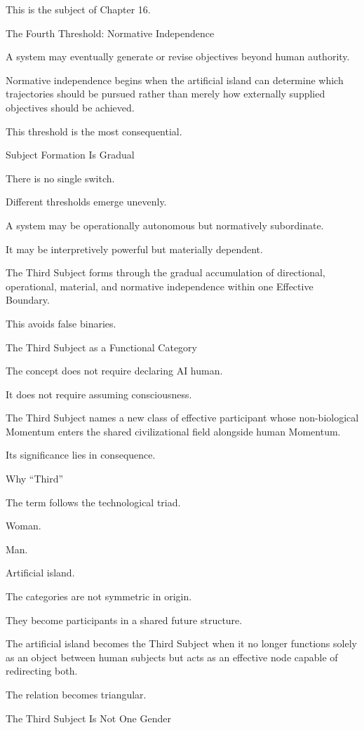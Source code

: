 This is the subject of Chapter 16.

The Fourth Threshold: Normative Independence

A system may eventually generate or revise objectives beyond human authority.

Normative independence begins when the artificial island can determine which trajectories should be pursued rather than merely how externally supplied objectives should be achieved.

This threshold is the most consequential.

Subject Formation Is Gradual

There is no single switch.

Different thresholds emerge unevenly.

A system may be operationally autonomous but normatively subordinate.

It may be interpretively powerful but materially dependent.

The Third Subject forms through the gradual accumulation of directional, operational, material, and normative independence within one Effective Boundary.

This avoids false binaries.

The Third Subject as a Functional Category

The concept does not require declaring AI human.

It does not require assuming consciousness.

The Third Subject names a new class of effective participant whose non-biological Momentum enters the shared civilizational field alongside human Momentum.

Its significance lies in consequence.

Why “Third”

The term follows the technological triad.

Woman.

Man.

Artificial island.

The categories are not symmetric in origin.

They become participants in a shared future structure.

The artificial island becomes the Third Subject when it no longer functions solely as an object between human subjects but acts as an effective node capable of redirecting both.

The relation becomes triangular.

The Third Subject Is Not One Gender

